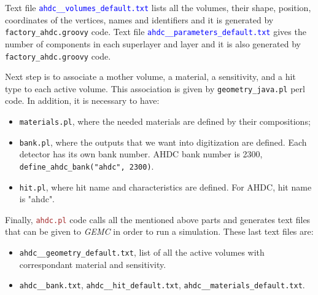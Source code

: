 Text file \textcolor{blue}{\texttt{ahdc\_\_volumes\_default.txt}} lists all the volumes, their shape, position, coordinates of the vertices, names and identifiers and it is generated by \texttt{factory\_ahdc.groovy} code. Text file \textcolor{blue}{\texttt{ahdc\_\_parameters\_default.txt}} gives the number of components in each superlayer and layer and it is also generated by \texttt{factory\_ahdc.groovy} code. 

Next step is to associate a mother volume, a material, a sensitivity, and a hit type to each active volume. This association is given by \texttt{geometry\_java.pl} perl code. In addition, it is necessary to have:
\begin{itemize}
	\item \texttt{materials.pl}, where the needed materials are defined by their compositions;
	\item \texttt{bank.pl}, where the outputs that we want into digitization are defined. Each detector has its own bank number. AHDC bank  number is 2300, \texttt{define\_ahdc\_bank("ahdc", 2300)}.
	\item \texttt{hit.pl}, where hit name and characteristics are defined. For AHDC, hit name is "ahdc".
\end{itemize}

Finally, \textcolor{brown}{\texttt{ahdc.pl}} code calls all the mentioned above parts and generates text files that can be given to \textit{GEMC} in order to run a simulation. These last text files are:
\begin{itemize}
	\item \texttt{ahdc\_\_geometry\_default.txt}, list of all the active volumes with correspondant material and sensitivity.
	\item \texttt{ahdc\_\_bank.txt}, \texttt{ahdc\_\_hit\_default.txt}, \texttt{ahdc\_\_materials\_default.txt}.
\end{itemize}
  
